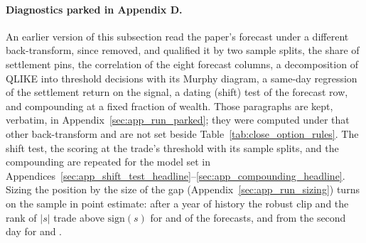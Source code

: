 \paragraph{Diagnostics parked in Appendix D.} An earlier version of this
subsection read the paper's forecast under a different back-transform, since
removed, and qualified it by two sample splits, the share of settlement pins, the
correlation of the eight forecast columns, a decomposition of QLIKE into threshold
decisions with its Murphy diagram, a same-day regression of the settlement return
on the signal, a dating (shift) test of the forecast row, and compounding at a
fixed fraction of wealth. Those paragraphs are kept, verbatim, in
Appendix~\ref{sec:app_run_parked}; they were computed under that other
back-transform and are not set beside Table~\ref{tab:close_option_rules}. The shift test,
the scoring at the trade's threshold with its sample splits, and the compounding are repeated
for the model set in
Appendices~\ref{sec:app_shift_test_headline}--\ref{sec:app_compounding_headline}.
Sizing the position by the size of the gap (Appendix~\ref{sec:app_run_sizing}) turns
on the sample in point estimate: after a year of history the robust clip and the rank of %
$|s|$ trade above $\mathrm{sign}(s)$ for \runappSzClipAbove{} and \runappSzRankAbove{} of
the \runappSzForecasts{} forecasts, and from the second day for \runappSzClipAboveTwo{}
and \runappSzRankAboveTwo.

